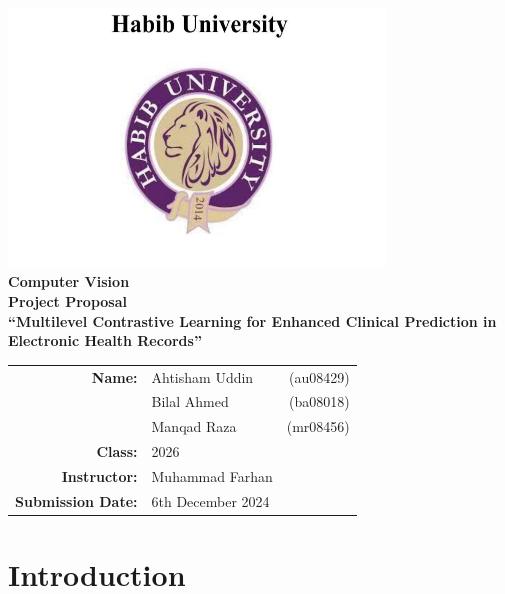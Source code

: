 \documentclass[a4paper]{article}
\begin{document}
\begin{center}
    \includegraphics[width=10cm]{LOGOHABIB.png} \\ 
    \vspace{5mm}
    {\huge \textbf{Computer Vision}} \\ %
    \vspace{7mm}
    {\LARGE \textbf{Project Proposal}} \\ %
    \vspace{15mm}
    {\Large \textbf{``Multilevel Contrastive Learning for Enhanced Clinical Prediction in Electronic Health Records''}}\\
    \vspace{70mm}
    \begin{minipage}{0.7\textwidth} 
        \begin{tabular}{rlr} 
            {\large \textbf{Name:}} & {\large Ahtisham Uddin} & {\large (au08429)} \\[2mm]
            & {\large Bilal Ahmed} & {\large (ba08018)} \\[2mm]
            & {\large Manqad Raza} & {\large (mr08456)} \\[3mm]
            {\large \textbf{Class:}} & {\large 2026} & \\[3mm]
            {\large \textbf{Instructor:}} & {\large Muhammad Farhan} & \\[3mm]
            {\large \textbf{Submission Date:}} & {\large 6th December 2024} &
        \end{tabular}
    \end{minipage}
    \vfill %
\end{center}
\newpage
\tableofcontents
\clearpage
\section{Introduction}
\end{document}
